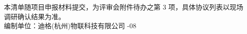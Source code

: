 \documentclass[11pt,a4paper]{ctexart}
\begin{document}
\vspace{1em}
\noindent\hrulefill

\begin{center}
\small 本清单随项目申报材料提交，为评审会附件待办之第 3 项，具体协议列表以现场调研确认结果为准。\\
编制单位：迪格(杭州)物联科技有限公司 -08
\end{center}
\end{document}
